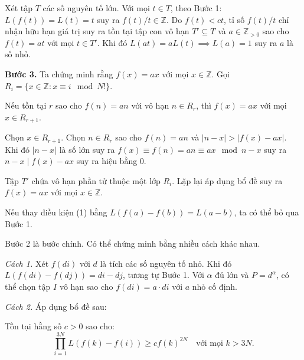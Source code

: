 \begin{problem}
\begin{soln}
    Xét tập \( T \) các số nguyên tố lớn. Với mọi \( t \in T \), theo Bước 1: \( L(f(t)) = L(t) = t \) suy ra \( f(t)/t \in \mathbb{Z} \).
    Do \( f(t) < ct \), tỉ số \( f(t)/t \) chỉ nhận hữu hạn giá trị suy ra tồn tại tập con vô hạn \( T' \subseteq T \) và \( a \in \mathbb{Z}_{>0} \) 
    sao cho \( f(t) = at \) với mọi \( t \in T' \).
    Khi đó \( L(at) = aL(t) \implies L(a) = 1 \) suy ra \( a \) là số nhỏ.

    \textbf{Bước 3.} Ta chứng minh rằng \( f(x) = ax \) với mọi \( x \in \mathbb{Z} \).
    Gọi \( R_i = \{ x \in \mathbb{Z} : x \equiv i \mod N! \} \).
    \begin{claim*}
        Nếu tồn tại \( r \) sao cho \( f(n) = an \) với vô hạn \( n \in R_r \), thì \( f(x) = ax \) với mọi \( x \in R_{r+1} \).
    \end{claim*}
    \begin{subproof}
        Chọn \( x \in R_{r+1} \). Chọn \( n \in R_r \) sao cho \( f(n) = an \) và \( |n - x| > |f(x) - ax| \). 
        Khi đó \( |n - x| \) là số lớn suy ra \( f(x) \equiv f(n) = an \equiv ax \mod n - x \) suy ra \( n - x \mid f(x) - ax \) suy ra hiệu bằng 0.
    \end{subproof}

    Tập \( T' \) chứa vô hạn phần tử thuộc một lớp \( R_i \). Lặp lại áp dụng bổ đề suy ra \( f(x) = ax \) với mọi \( x \in \mathbb{Z} \).
\end{soln}

\begin{remark*}
    Nếu thay điều kiện (1) bằng \( L(f(a) - f(b)) = L(a - b) \), ta có thể bỏ qua Bước 1.
\end{remark*}

\begin{remark*}
    Bước 2 là bước chính. Có thể chứng minh bằng nhiều cách khác nhau.

    \textit{Cách 1.} Xét \( f(di) \) với \( d \) là tích các số nguyên tố nhỏ. Khi đó \( L(f(di) - f(dj)) = di - dj \), tương tự Bước 1.
    Với \( \alpha \) đủ lớn và \( P = d^\alpha \), có thể chọn tập \( I \) vô hạn sao cho \( f(di) = a \cdot di \) với \( a \) nhỏ cố định.

    \textit{Cách 2.} Áp dụng bổ đề sau:
    \begin{lemma*}
        Tồn tại hằng số \( c > 0 \) sao cho:
        \[
            \prod_{i=1}^{3N} L(f(k) - f(i)) \ge c f(k)^{2N} \quad \text{với mọi } k > 3N.
        \]
    \end{lemma*}


\end{remark*}
\end{problem}
